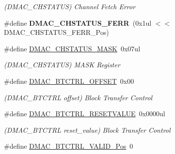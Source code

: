 \begin{DoxyCompactItemize}
\begin{DoxyCompactList}\small\item\em (D\+M\+A\+C\+\_\+\+C\+H\+S\+T\+A\+T\+U\+S) Channel Fetch Error \end{DoxyCompactList}\item 
\hypertarget{group___s_a_m_l21___d_m_a_c_gab2a8f0538c859cf412cdc26b3eb30a7a}{}\#define {\bfseries D\+M\+A\+C\+\_\+\+C\+H\+S\+T\+A\+T\+U\+S\+\_\+\+F\+E\+R\+R}~(0x1ul $<$$<$ D\+M\+A\+C\+\_\+\+C\+H\+S\+T\+A\+T\+U\+S\+\_\+\+F\+E\+R\+R\+\_\+\+Pos)\label{group___s_a_m_l21___d_m_a_c_gab2a8f0538c859cf412cdc26b3eb30a7a}

\item 
\hypertarget{group___s_a_m_l21___d_m_a_c_gafb5dd45a23313443434478b289e0313b}{}\#define \hyperlink{group___s_a_m_l21___d_m_a_c_gafb5dd45a23313443434478b289e0313b}{D\+M\+A\+C\+\_\+\+C\+H\+S\+T\+A\+T\+U\+S\+\_\+\+M\+A\+S\+K}~0x07ul\label{group___s_a_m_l21___d_m_a_c_gafb5dd45a23313443434478b289e0313b}

\begin{DoxyCompactList}\small\item\em (D\+M\+A\+C\+\_\+\+C\+H\+S\+T\+A\+T\+U\+S) M\+A\+S\+K Register \end{DoxyCompactList}\item 
\hypertarget{group___s_a_m_l21___d_m_a_c_ga7ae70add09374db15503eba80799017b}{}\#define \hyperlink{group___s_a_m_l21___d_m_a_c_ga7ae70add09374db15503eba80799017b}{D\+M\+A\+C\+\_\+\+B\+T\+C\+T\+R\+L\+\_\+\+O\+F\+F\+S\+E\+T}~0x00\label{group___s_a_m_l21___d_m_a_c_ga7ae70add09374db15503eba80799017b}

\begin{DoxyCompactList}\small\item\em (D\+M\+A\+C\+\_\+\+B\+T\+C\+T\+R\+L offset) Block Transfer Control \end{DoxyCompactList}\item 
\hypertarget{group___s_a_m_l21___d_m_a_c_ga972a7cc0c2f21e04d4b6123a45339876}{}\#define \hyperlink{group___s_a_m_l21___d_m_a_c_ga972a7cc0c2f21e04d4b6123a45339876}{D\+M\+A\+C\+\_\+\+B\+T\+C\+T\+R\+L\+\_\+\+R\+E\+S\+E\+T\+V\+A\+L\+U\+E}~0x0000ul\label{group___s_a_m_l21___d_m_a_c_ga972a7cc0c2f21e04d4b6123a45339876}

\begin{DoxyCompactList}\small\item\em (D\+M\+A\+C\+\_\+\+B\+T\+C\+T\+R\+L reset\+\_\+value) Block Transfer Control \end{DoxyCompactList}\item 
\hypertarget{group___s_a_m_l21___d_m_a_c_ga33cf66814fec850c4033159ae948b74c}{}\#define \hyperlink{group___s_a_m_l21___d_m_a_c_ga33cf66814fec850c4033159ae948b74c}{D\+M\+A\+C\+\_\+\+B\+T\+C\+T\+R\+L\+\_\+\+V\+A\+L\+I\+D\+\_\+\+Pos}~0\label{group___s_a_m_l21___d_m_a_c_ga33cf66814fec850c4033159ae948b74c}


\end{DoxyCompactItemize}
